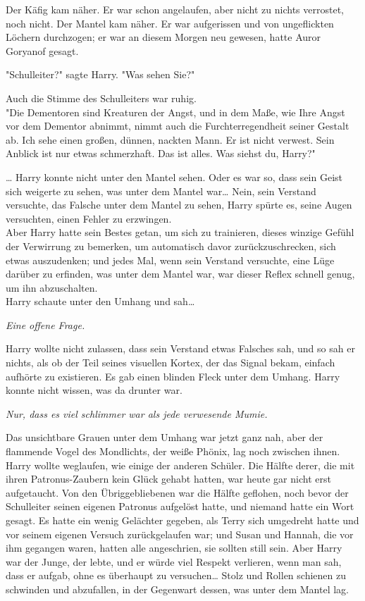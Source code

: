 {Der Käfig kam näher. Er war schon angelaufen, aber nicht zu nichts verrostet, noch nicht. Der Mantel kam näher. Er war aufgerissen und von ungeflickten Löchern durchzogen; er war an diesem Morgen neu gewesen, hatte Auror Goryanof gesagt.

"Schulleiter?" sagte Harry. "Was sehen Sie?"

Auch die Stimme des Schulleiters war ruhig.\\ "Die Dementoren sind Kreaturen der Angst, und in dem Maße, wie Ihre Angst vor dem Dementor abnimmt, nimmt auch die Furchterregendheit seiner Gestalt ab. Ich sehe einen großen, dünnen, nackten Mann. Er ist nicht verwest. Sein Anblick ist nur etwas schmerzhaft. Das ist alles. Was siehst du, Harry?"

… Harry konnte nicht unter den Mantel sehen. Oder es war so, dass sein Geist sich weigerte zu sehen, was unter dem Mantel war… Nein, sein Verstand versuchte, das Falsche unter dem Mantel zu sehen, Harry spürte es, seine Augen versuchten, einen Fehler zu erzwingen.\\ Aber Harry hatte sein Bestes getan, um sich zu trainieren, dieses winzige Gefühl der Verwirrung zu bemerken, um automatisch davor zurückzuschrecken, sich etwas auszudenken; und jedes Mal, wenn sein Verstand versuchte, eine Lüge darüber zu erfinden, was unter dem Mantel war, war dieser Reflex schnell genug, um ihn abzuschalten.\\ Harry schaute unter den Umhang und sah…

\emph{Eine offene Frage.}

Harry wollte nicht zulassen, dass sein Verstand etwas Falsches sah, und so sah er nichts, als ob der Teil seines visuellen Kortex, der das Signal bekam, einfach aufhörte zu existieren. Es gab einen blinden Fleck unter dem Umhang. Harry konnte nicht wissen, was da drunter war.

\emph{Nur, dass es viel schlimmer war als jede verwesende Mumie.}

Das unsichtbare Grauen unter dem Umhang war jetzt ganz nah, aber der flammende Vogel des Mondlichts, der weiße Phönix, lag noch zwischen ihnen.\\ Harry wollte weglaufen, wie einige der anderen Schüler. Die Hälfte derer, die mit ihren Patronus-Zaubern kein Glück gehabt hatten, war heute gar nicht erst aufgetaucht. Von den Übriggebliebenen war die Hälfte geflohen, noch bevor der Schulleiter seinen eigenen Patronus aufgelöst hatte, und niemand hatte ein Wort gesagt. Es hatte ein wenig Gelächter gegeben, als Terry sich umgedreht hatte und vor seinem eigenen Versuch zurückgelaufen war; und Susan und Hannah, die vor ihm gegangen waren, hatten alle angeschrien, sie sollten still sein. Aber Harry war der Junge, der lebte, und er würde viel Respekt verlieren, wenn man sah, dass er aufgab, ohne es überhaupt zu versuchen… Stolz und Rollen schienen zu schwinden und abzufallen, in der Gegenwart dessen, was unter dem Mantel lag.

}
